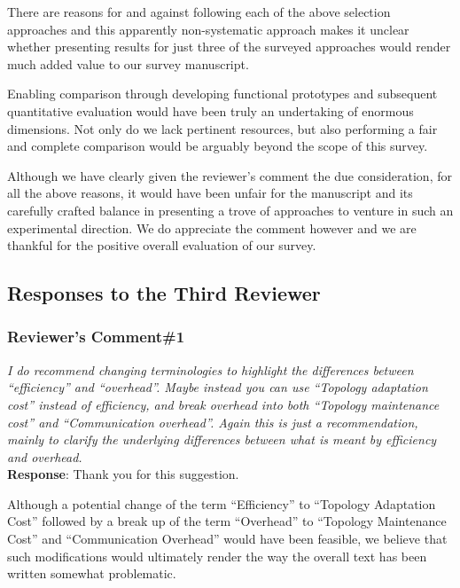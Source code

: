 \documentclass[10pt,letterpaper]{article}
\begin{document}
There are reasons for and against following each of the 
above selection approaches and this apparently non-systematic approach makes
it unclear whether presenting results for just three of 
the surveyed approaches would render much added value
to our survey manuscript.

Enabling comparison through developing functional prototypes and subsequent 
quantitative evaluation would have been truly an undertaking of 
enormous dimensions. 
Not only do we lack pertinent resources, but also 
performing a fair and complete comparison would be arguably 
beyond the scope of this survey.

Although we have clearly given the reviewer's comment
the due consideration, for all the above reasons, it would have been 
unfair for the manuscript and its carefully crafted balance in 
presenting a trove of approaches to venture in such an experimental  direction. 
We do appreciate the comment however and we are thankful for the positive 
overall evaluation of our survey.


\clearpage
\subsection*{\textbf{\textsf{Responses to the Third Reviewer}}}

\subsubsection*{\textbf{\textsf{Reviewer's Comment\#1}}}
\noindent
\emph{I do recommend changing terminologies to highlight the differences between
``efficiency'' and ``overhead''. Maybe instead you can use
``Topology adaptation cost'' instead of efficiency, and break overhead into both
``Topology maintenance cost'' and ``Communication overhead''. Again this is just a
recommendation, mainly to clarify the underlying differences between what is meant
by efficiency and overhead.}\\[6pt]

\noindent
\textbf{\textsf{Response}}:
Thank you for this suggestion. 

Although a potential change of the 
term ``Efficiency'' to ``Topology Adaptation Cost''
followed by a break up of the term 
``Overhead'' to ``Topology Maintenance Cost'' and ``Communication Overhead''
would have been feasible, we believe that such modifications would ultimately 
render the way the overall text has been written somewhat problematic.
 
\end{document}
